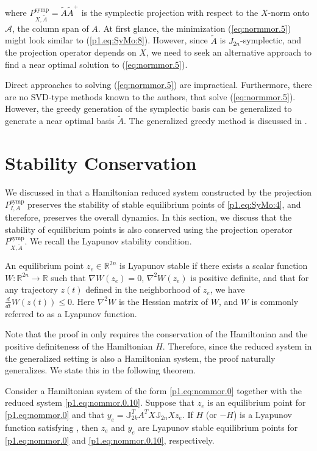 where $P^\text{symp}_{X,\tilde A} = \tilde A \tilde A^+$ is the symplectic projection with respect to the $X$-norm onto $\mathcal A$, the column span of $A$. At first glance, the minimization (\ref{eq:normmor.5}) might look similar to (\ref{p1.eq:SyMo:8}). However, since $\tilde A$ is $J_{2n}$-symplectic, and the projection operator depends on $X$, we need to seek an alternative approach to find a near optimal solution to (\ref{eq:normmor.5}). 

Direct approaches to solving (\ref{eq:normmor.5}) are impractical. Furthermore, there are no SVD-type methods known to the authors, that solve (\ref{eq:normmor.5}). However, the greedy generation of the symplectic basis can be generalized to generate a near optimal basis $\tilde A$. The generalized greedy method is discussed in .

\section{Stability Conservation} 
We discussed in  that a Hamiltonian reduced system constructed by the projection $P^{\text{symp}}_{I,A}$ preserves the stability of stable equilibrium points of \eqref{p1.eq:SyMo:4}, and therefore, preserves the overall dynamics. In this section, we discuss that the stability of equilibrium points is also conserved using the projection operator $P^{\text{symp}}_{X,\tilde A}$. We recall the Lyapunov stability condition.

\begin{proposition} \label{prop:new1}
\cite{bhatia2002stability} An equilibrium point $z_e\in \mathbb R^{2n}$ is Lyapunov stable if there exists a scalar function $W:\mathbb R^{2n} \to \mathbb R$ such that $\nabla W(z_e) = 0$, $\nabla^2 W(z_e)$ is positive definite, and that for any trajectory $z(t)$ defined in the neighborhood of $z_e$, we have $\frac{d}{dt} W(z(t))\leq 0$. Here $\nabla^2 W$ is the Hessian matrix of $W$, and $W$ is commonly referred to as a Lyapunov function.
\end{proposition}

Note that the proof in  only requires the conservation of the Hamiltonian and the positive definiteness of the Hamiltonian $H$. Therefore, since the reduced system in the generalized setting is also a Hamiltonian system, the proof naturally generalizes. We state this in the following theorem.

\begin{theorem}
\cite{doi:10.1137/17M1111991} Consider a Hamiltonian system of the form \eqref{p1.eq:nommor.0} together with the reduced system \eqref{p1.eq:nommor.0.10}. Suppose that $z_e$ is an equilibrium point for \eqref{p1.eq:nommor.0} and that $y_e = \mathbb J_{2k}^T A^T X \mathbb J_{2n} X z_e$. If $H$ (or $-H$) is a Lyapunov function satisfying , then $z_e$ and $y_e$ are Lyapunov stable equilibrium points for \eqref{p1.eq:nommor.0} and \eqref{p1.eq:nommor.0.10}, respectively.
\end{theorem}


